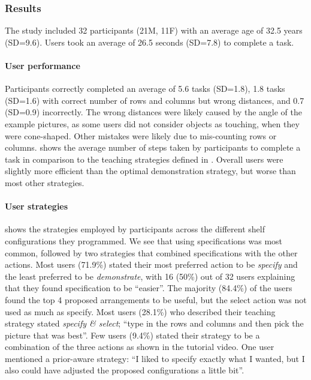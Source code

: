 \subsubsection{Results}
The study included 32 participants (21M, 11F) with an average age of 32.5 years (SD=9.6).
Users took an average of 26.5 seconds (SD=7.8) to complete a task.

\paragraph{User performance} Participants correctly completed an average of 5.6 tasks (SD=1.8), 1.8 tasks (SD=1.6) with correct number of rows and columns but wrong distances, and 0.7 (SD=0.9) incorrectly.
The wrong distances were likely caused by the angle of the example pictures, as some users did not consider objects as touching, \eg when they were cone-shaped.
Other mistakes were likely due to mis-counting rows or columns.
 shows the average number of  steps taken by participants to complete a task in comparison to the teaching strategies defined in . 
Overall users were slightly more efficient than the optimal demonstration strategy, but worse than most other strategies. 

\paragraph{User strategies}  shows the strategies employed by participants across the different shelf configurations they programmed.
We see that using specifications was most common, followed by two strategies that combined specifications with the other actions.
Most users (71.9\%) stated their most preferred action to be \textit{specify} and the least preferred to be \textit{demonstrate}, with 16 (50\%) out of 32 users explaining that they found specification to be ``easier''.
The majority (84.4\%) of the users found the top 4 proposed arrangements to be useful, but the select action was not used as much as specify.
Most users (28.1\%) who described their teaching strategy stated \textit{specify \& select}; \eg ``type in the rows and columns and then pick the picture that was best''.
Few users (9.4\%) stated their strategy to be a combination of the three actions as shown in the tutorial video. 
One user mentioned a prior-aware strategy: ``I liked to specify exactly what I wanted, but I also could have adjusted the proposed configurations a little bit''. %


